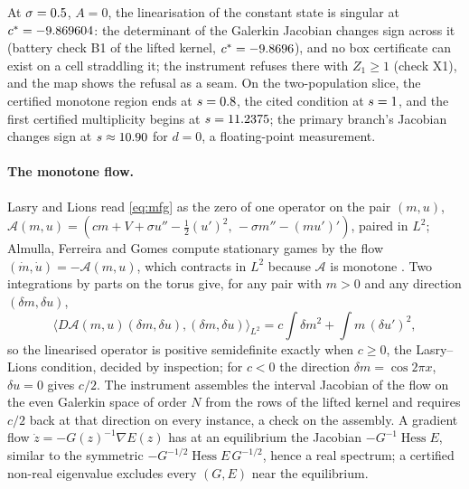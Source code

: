 \documentclass[11pt]{article}
\theoremstyle{definition}
\newcommand{\cstar}{c^{*}}
\begin{document}
\begin{proposition}\label{prop:wall}
At $\sigma=0.5$, $A=0$, the linearisation of the constant state is singular at $\cstar=\OneCStarSix$: the determinant of the Galerkin Jacobian changes sign across it (battery check B1 of the lifted kernel, $\cstar=\CapBoneCStar$), and no box certificate can exist on a cell straddling it; the instrument refuses there with $Z_1\ge1$ (check X1), and the map shows the refusal as a seam. On the two-population slice, the certified monotone region ends at $s=0.8$, the cited condition at $s=1$, and the first certified multiplicity begins at $s=11.2375$; the primary branch's Jacobian changes sign at $s\approx10.90$ for $d=0$, a floating-point measurement.
\end{proposition}

\paragraph{The monotone flow.} Lasry and Lions read \eqref{eq:mfg} as the zero of one operator on the pair $(m,u)$, $\mathcal A(m,u)=(cm+V+\sigma u''-\tfrac12(u')^2,\,-\sigma m''-(mu')')$, paired in $L^2$; Almulla, Ferreira and Gomes compute stationary games by the flow $(\dot m,\dot u)=-\mathcal A(m,u)$, which contracts in $L^2$ because $\mathcal A$ is monotone \cite{AFG17,FGT25}. Two integrations by parts on the torus give, for any pair with $m>0$ and any direction $(\delta m,\delta u)$,
\begin{equation}\label{eq:form}
\langle D\mathcal A(m,u)(\delta m,\delta u),(\delta m,\delta u)\rangle_{L^2}=c\int\delta m^2+\int m\,(\delta u')^2 ,
\end{equation}
so the linearised operator is positive semidefinite exactly when $c\ge0$, the Lasry--Lions condition, decided by inspection; for $c<0$ the direction $\delta m=\cos2\pi x$, $\delta u=0$ gives $c/2$. The instrument assembles the interval Jacobian of the flow on the even Galerkin space of order $N$ from the rows of the lifted kernel and requires $c/2$ back at that direction on every instance, a check on the assembly. A gradient flow $\dot z=-G(z)^{-1}\nabla E(z)$ has at an equilibrium the Jacobian $-G^{-1}\operatorname{Hess}E$, similar to the symmetric $-G^{-1/2}\operatorname{Hess}E\,G^{-1/2}$, hence a real spectrum; a certified non-real eigenvalue excludes every $(G,E)$ near the equilibrium.
\end{document}
